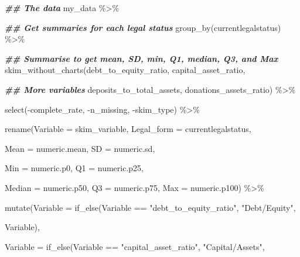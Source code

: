 \documentclass[a4paper,nobind]{templates/ociamthesis}
\newenvironment{Shaded}{\begin{snugshade}}{\end{snugshade}}
\newcommand{\AttributeTok}[1]{\textcolor[rgb]{0.77,0.63,0.00}{#1}}
\newcommand{\DocumentationTok}[1]{\textcolor[rgb]{0.56,0.35,0.01}{\textbf{\textit{#1}}}}
\newcommand{\FunctionTok}[1]{\textcolor[rgb]{0.00,0.00,0.00}{#1}}
\newcommand{\NormalTok}[1]{#1}
\newcommand{\SpecialCharTok}[1]{\textcolor[rgb]{0.00,0.00,0.00}{#1}}
\newcommand{\StringTok}[1]{\textcolor[rgb]{0.31,0.60,0.02}{#1}}
\renewenvironment{Shaded}
{
  \vspace{10pt}%
  \begin{snugshade}%
}{%
  \end{snugshade}%
  \vspace{8pt}%
}
\begin{document}
\begin{landscape}

\begin{Shaded}
\begin{Highlighting}[]
\DocumentationTok{\#\# The data}
\NormalTok{my\_data }\SpecialCharTok{\%\textgreater{}\%} 
  
  \DocumentationTok{\#\# Get summaries for each legal status}
  \FunctionTok{group\_by}\NormalTok{(currentlegalstatus) }\SpecialCharTok{\%\textgreater{}\%} 
  
  \DocumentationTok{\#\# Summarise to get mean, SD, min, Q1, median, Q3, and Max}
  \FunctionTok{skim\_without\_charts}\NormalTok{(debt\_to\_equity\_ratio, capital\_asset\_ratio, }
                      
                      \DocumentationTok{\#\# More variables}
\NormalTok{                      deposits\_to\_total\_assets, donations\_assets\_ratio) }\SpecialCharTok{\%\textgreater{}\%}
  
  \FunctionTok{select}\NormalTok{(}\SpecialCharTok{{-}}\NormalTok{complete\_rate, }\SpecialCharTok{{-}}\NormalTok{n\_missing, }\SpecialCharTok{{-}}\NormalTok{skim\_type) }\SpecialCharTok{\%\textgreater{}\%} 

  \FunctionTok{rename}\NormalTok{(}\AttributeTok{Variable =}\NormalTok{ skim\_variable, }\AttributeTok{Legal\_form =}\NormalTok{ currentlegalstatus, }
         
         \AttributeTok{Mean =}\NormalTok{ numeric.mean, }\AttributeTok{SD =}\NormalTok{ numeric.sd, }
         
         \AttributeTok{Min =}\NormalTok{ numeric.p0, }\AttributeTok{Q1 =}\NormalTok{ numeric.p25,}
         
         \AttributeTok{Median =}\NormalTok{ numeric.p50, }\AttributeTok{Q3 =}\NormalTok{ numeric.p75, }\AttributeTok{Max =}\NormalTok{ numeric.p100) }\SpecialCharTok{\%\textgreater{}\%} 
  
  \FunctionTok{mutate}\NormalTok{(}\AttributeTok{Variable =} \FunctionTok{if\_else}\NormalTok{(Variable }\SpecialCharTok{==} \StringTok{"debt\_to\_equity\_ratio"}\NormalTok{, }\StringTok{"Debt/Equity"}\NormalTok{, }
                            
\NormalTok{                            Variable), }
         
         \AttributeTok{Variable =} \FunctionTok{if\_else}\NormalTok{(Variable }\SpecialCharTok{==} \StringTok{"capital\_asset\_ratio"}\NormalTok{, }\StringTok{"Capital/Assets"}\NormalTok{, }
                            

\end{Highlighting}
\end{Shaded}
\end{landscape}
\end{document}
